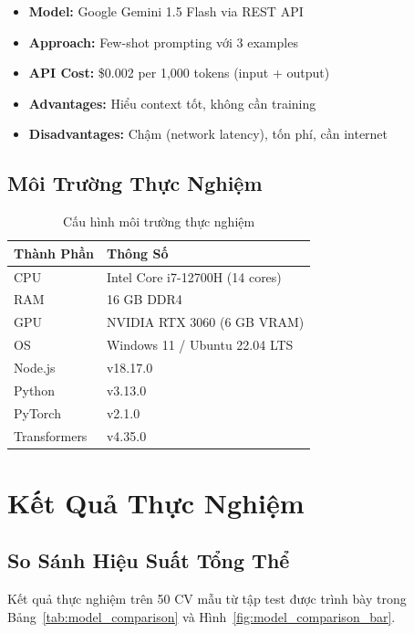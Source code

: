 \begin{itemize}
    \item \textbf{Model:} Google Gemini 1.5 Flash via REST API
    \item \textbf{Approach:} Few-shot prompting với 3 examples
    \item \textbf{API Cost:} \$0.002 per 1,000 tokens (input + output)
    \item \textbf{Advantages:} Hiểu context tốt, không cần training
    \item \textbf{Disadvantages:} Chậm (network latency), tốn phí, cần internet
\end{itemize}

\subsection{Môi Trường Thực Nghiệm}

\begin{table}[h]
\centering
\caption{Cấu hình môi trường thực nghiệm}
\label{tab:environment}
\begin{tabular}{ll}
\hline
\textbf{Thành Phần} & \textbf{Thông Số} \\
\hline
CPU & Intel Core i7-12700H (14 cores) \\
RAM & 16 GB DDR4 \\
GPU & NVIDIA RTX 3060 (6 GB VRAM) \\
OS & Windows 11 / Ubuntu 22.04 LTS \\
Node.js & v18.17.0 \\
Python & v3.13.0 \\
PyTorch & v2.1.0 \\
Transformers & v4.35.0 \\
\hline
\end{tabular}
\end{table}

\section{Kết Quả Thực Nghiệm}
\label{sec:experimental_results}

\subsection{So Sánh Hiệu Suất Tổng Thể}

Kết quả thực nghiệm trên 50 CV mẫu từ tập test được trình bày trong Bảng~\ref{tab:model_comparison} và Hình~\ref{fig:model_comparison_bar}.

